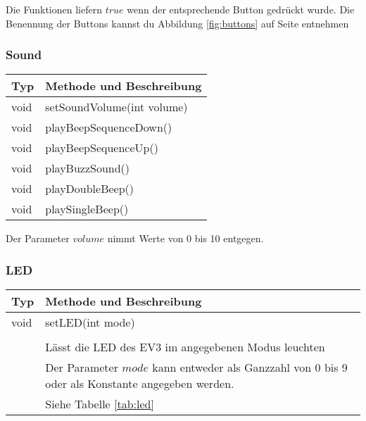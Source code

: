 		Die Funktionen liefern $true$ wenn der entsprechende Button gedrückt wurde. Die Benennung der Buttons kannst du Abbildung \ref{fig:buttons} auf Seite \pageref{fig:buttons} entnehmen

	\subsubsection{Sound}
		\begin{table}[htbp]
		\begin{tabular}{|p{} p{}|}
		\hline
		\textbf{Typ} & \textbf{Methode und Beschreibung} \\ \hline
		void & setSoundVolume(int volume) \\ 
		void & playBeepSequenceDown() \\ 
		void & playBeepSequenceUp() \\ 
		void & playBuzzSound() \\ 
		void & playDoubleBeep() \\ 
		void & playSingleBeep() \\ \hline
		\end{tabular}
		\end{table}
		
		Der Parameter $volume$ nimmt Werte von 0 bis 10 entgegen.
		
	\newpage
	\subsubsection{LED}		
		\begin{table}[htbp]
		\begin{tabular}{|p{} p{}|}
		\hline
		\textbf{Typ} & \textbf{Methode und Beschreibung} \\ \hline
		void & setLED(int mode) \\ 
		&\\
		& Lässt die LED des EV3 im angegebenen Modus leuchten\\
		& Der Parameter $mode$ kann entweder als Ganzzahl von 0 bis 9 oder als Konstante angegeben werden. \\
		& Siehe Tabelle \ref{tab:led}\\
		\hline
		
		\end{tabular}
		\end{table}
		
		
		
